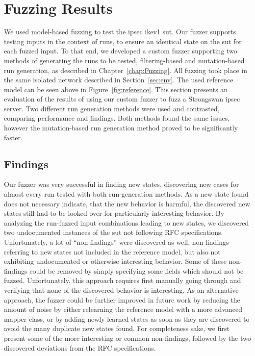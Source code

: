\section{Fuzzing Results} \label{sec:fuzzresults}
We used model-based fuzzing to test the \ac{ipsec} \ac{ike}v1 \ac{sut}. Our fuzzer supports testing inputs in the context of runs, to ensure an identical state on the \ac{sut} for each fuzzed input. To that end, we developed a custom fuzzer supporting two methods of generating the runs to be tested, filtering-based and mutation-based run generation, as described in Chapter~\ref{chap:Fuzzing}. All fuzzing took place in the same isolated network described in Section~\ref{sec:env}. The used reference model can be seen above in Figure~\ref{fig:reference}. This section presents an evaluation of the results of using our custom fuzzer to fuzz a Strongswan \ac{ipsec} server. Two different run generation methods were used and contrasted, comparing performance and findings. Both methods found the same issues, however the mutation-based run generation method proved to be significantly faster.

\subsection{Findings} \label{subsec:findings}
Our fuzzer was very successful in finding new states, discovering new cases for almost every run tested with both run-generation methods. As a new state found does not necessary indicate, that the new behavior is harmful, the discovered new states still had to be looked over for particularly interesting behavior. By analyzing the run-fuzzed input combinations leading to new states, we discovered two undocumented instances of the \ac{sut} not following RFC specifications. Unfortunately, a lot of ``non-findings'' were discovered as well, non-findings referring to new states not included in the reference model, but also not exhibiting undocumented or otherwise interesting behavior. Some of these non-findings could be removed by simply specifying some fields which should not be fuzzed. Unfortunately, this approach requires first manually going through and verifying that none of the discovered behavior is interesting. As an alternative approach, the fuzzer could be further improved in future work by reducing the amount of noise by either relearning the reference model with a more advanced mapper class, or by adding newly learned states as soon as they are discovered to avoid the many duplicate new states found. 
For completeness sake, we first present some of the more interesting or common non-findings, followed by the two discovered deviations from the RFC specifications. 

